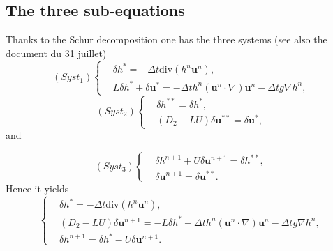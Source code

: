 \documentclass[a4paper, 11pt]{article}
\begin{document}
\subsection{The three sub-equations}
Thanks to the Schur decomposition one has the three systems (see also the document du 31 juillet)
\begin{equation*}
(Syst_1)\left\{\begin{split}
&\delta h^*=-\Delta t\text{div}(h^n\boldsymbol{u}^n),\\
&L\delta h^*+\delta \boldsymbol{u}^*=-\Delta th^n\left(\boldsymbol{u}^n\cdot\nabla\right)\boldsymbol{u}^n-\Delta tg\nabla h^n,
\end{split}\right.
\end{equation*}
\begin{equation*}
(Syst_2)\left\{\begin{split}
&\delta h^{**}=\delta h^*,\\
&(D_2-LU)\delta \boldsymbol{u}^{**}=\delta \boldsymbol{u}^{*},
\end{split}
\right.
\end{equation*}
and

\begin{equation*}
(Syst_3)\left\{\begin{split}
&\delta h^{n+1}+U\delta \boldsymbol{u}^{n+1}=\delta h^{**},\\
&\delta \boldsymbol{u}^{n+1}=\delta \boldsymbol{u}^{**}.
\end{split}\right.
\end{equation*}
Hence it yields
\begin{equation*}
\left\{
\begin{split}
&\delta h^{*}=-\Delta t\text{div}(h^n\boldsymbol{u}^n),\\
&(D_2-LU)\delta \boldsymbol{u}^{n+1}=-L\delta h^*-\Delta th^n(\boldsymbol{u}^n\cdot\nabla)\boldsymbol{u}^n-\Delta tg\nabla h^n,\\
&\delta h^{n+1}=\delta h^*-U\delta \boldsymbol{u}^{n+1}.
\end{split}\right.
\end{equation*}
\end{document}
